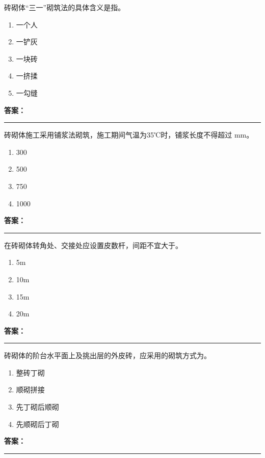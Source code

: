 \documentclass[UTF8,fontset=fandol,11pt]{ctexart}
\newcommand{\answerline}{\textcolor{answerred}{\rule{2.4cm}{0.7pt}}}
\begin{document}
\begin{quizbox}[title={第 12 题}]
砖砌体“三一”砌筑法的具体含义是指。\\
\begin{enumerate}[label=\Alph*.]
\item 一个人
\item 一铲灰
\item 一块砖
\item 一挤揉
\item 一勾缝
\end{enumerate}
\textbf{\textcolor{answerred}{答案：}} \answerline
\end{quizbox}

\begin{quizbox}[title={第 13 题}]
砖砌体施工采用铺浆法砌筑，施工期间气温为35℃时，铺浆长度不得超过 mm。\\
\begin{enumerate}[label=\Alph*.]
\item 300
\item 500
\item 750
\item 1000
\end{enumerate}
\textbf{\textcolor{answerred}{答案：}} \answerline
\end{quizbox}

\begin{quizbox}[title={第 14 题}]
在砖砌体转角处、交接处应设置皮数杆，间距不宜大于。\\
\begin{enumerate}[label=\Alph*.]
\item 5m
\item 10m
\item 15m
\item 20m
\end{enumerate}
\textbf{\textcolor{answerred}{答案：}} \answerline
\end{quizbox}

\begin{quizbox}[title={第 15 题}]
砖砌体的阶台水平面上及挑出层的外皮砖，应采用的砌筑方式为。\\
\begin{enumerate}[label=\Alph*.]
\item 整砖丁砌
\item 顺砌拼接
\item 先丁砌后顺砌
\item 先顺砌后丁砌
\end{enumerate}
\textbf{\textcolor{answerred}{答案：}} \answerline
\end{quizbox}
\end{document}
